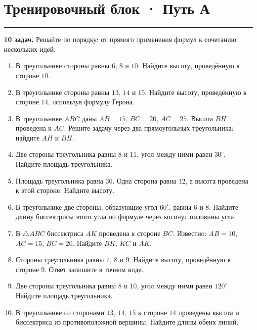 \documentclass[a4paper,12pt]{article}
\newcommand{\sectionline}{\par\vspace{0.2em}\noindent\color{rulegray}\rule{\linewidth}{0.6pt}\par\color{textgray}\vspace{0.45em}}
\begin{document}
\section*{Тренировочный блок · Путь А}
\sectionline
\textbf{10 задач.} Решайте по порядку: от прямого применения формул к сочетанию нескольких идей.

\begin{enumerate}
  \item В треугольнике стороны равны $6$, $8$ и $10$. Найдите высоту, проведённую к стороне $10$.

  \item В треугольнике стороны равны $13$, $14$ и $15$. Найдите высоту, проведённую к стороне $14$, используя формулу Герона.

  \item В треугольнике $ABC$ даны $AB=15$, $BC=20$, $AC=25$. Высота $BH$ проведена к $AC$. Решите задачу через два прямоугольных треугольника: найдите $AH$ и $BH$.

  \item Две стороны треугольника равны $8$ и $11$, угол между ними равен $30^\circ$. Найдите площадь треугольника.

  \item Площадь треугольника равна $30$. Одна сторона равна $12$, а высота проведена к этой стороне. Найдите высоту.

  \item В треугольнике две стороны, образующие угол $60^\circ$, равны $6$ и $8$. Найдите длину биссектрисы этого угла по формуле через косинус половины угла.

  \item В $\triangle ABC$ биссектриса $AK$ проведена к стороне $BC$. Известно: $AB=10$, $AC=15$, $BC=20$. Найдите $BK$, $KC$ и $AK$.

  \item Стороны треугольника равны $7$, $8$ и $9$. Найдите высоту, проведённую к стороне $9$. Ответ запишите в точном виде.

  \item Две стороны треугольника равны $8$ и $10$, угол между ними равен $120^\circ$. Найдите площадь треугольника.

  \item В треугольнике со сторонами $13$, $14$, $15$ к стороне $14$ проведены высота и биссектриса из противоположной вершины. Найдите длины обеих линий.
\end{enumerate}
\clearpage
\end{document}
